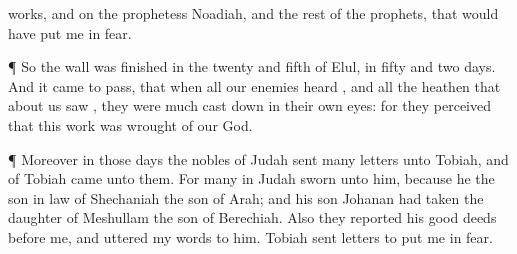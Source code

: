 {works, and on the
prophetess
Noadiah, and the
rest of the
prophets, that would have put me in
fear.
\par }{\PP {}¶ So the
wall was
finished in the
twenty and
fifth
{} of
{}
Elul, in
fifty and
two
days.
And it came to pass, that when all our
enemies
heard
{}, and all the
heathen that
{} about
us
saw
{}, they were
much cast
down in their own
eyes: for they
perceived that this
work was
wrought of our
God.
\par }{\PP {}¶ Moreover in those
days the
nobles of
Judah
sent
many
letters unto
Tobiah, and
{} of
Tobiah
came unto them.
For
{}
many in
Judah
sworn unto him, because he
{} the son in
law of
Shechaniah the
son of
Arah; and his
son
Johanan had
taken the
daughter of
Meshullam the
son of
Berechiah.
Also they
reported his good
deeds
before me, and
uttered my
words to him.
{}
Tobiah
sent
letters to put me in
fear.

}
